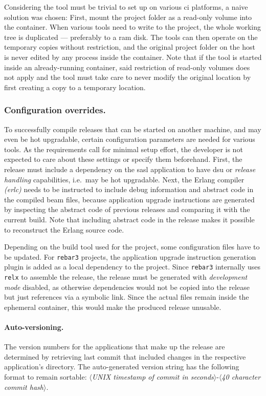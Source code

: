 Considering the tool must be trivial to set up on various \acrshort{ci} platforms, a naive solution was chosen: First, mount the project folder as a read-only volume into the container. When various tools need to write to the project, the whole working tree is duplicated --- preferably to a \acrshort{ram} disk. The tools can then operate on the temporary copies without restriction, and the original project folder on the host is never edited by any process inside the container. Note that if the tool is started inside an already-running container, said restriction of read-only volumes does not apply and the tool must take care to never modify the original location by first creating a copy to a temporary location.


\subsubsection{Configuration overrides.} To successfully compile releases that can be started on another machine, and may even be hot upgradable, certain configuration parameters are needed for various tools. As the requirements call for minimal setup effort, the developer is not expected to care about these settings or specify them beforehand. First, the release must include a dependency on the \acrfull{sasl} application to have \acrshort{dsu} or \emph{release handling} capabilities, i.e.~may be hot upgradable. Next, the Erlang compiler \emph{(erlc)} needs to be instructed to include debug information and abstract code in the compiled \acrshort{beam} files, because application upgrade instructions are generated by inspecting the abstract code of previous releases and comparing it with the current build. Note that including abstract code in the release makes it possible to reconstruct the Erlang source code.~\cite{doc:otp}

Depending on the build tool used for the project, some configuration files have to be updated. For \lstinline|rebar3| projects, the application upgrade instruction generation plugin is added as a local dependency to the project. Since \lstinline|rebar3| internally uses \lstinline|relx| to assemble the release, the release must be generated with \emph{development mode} disabled, as otherwise dependencies would not be copied into the release but just references via a symbolic link. Since the actual files remain inside the ephemeral container, this would make the produced release unusable.

\paragraph{Auto-versioning.} The version numbers for the applications that make up the release are determined by retrieving last commit that included changes in the respective application's directory. The auto-generated version string has the following format to remain sortable: $\langle$\emph{UNIX timestamp of commit in seconds}$\rangle$-$\langle$\emph{40 character commit hash}$\rangle$.

